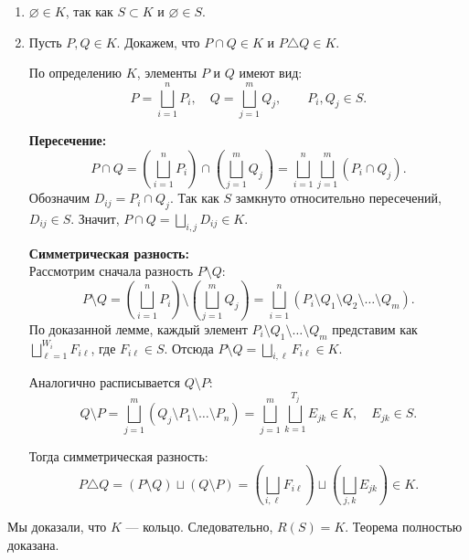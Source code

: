 \begin{Proof}
    \begin{enumerate}[label=\arabic*)]
        \item $\varnothing \in K$, так как $S \subset K$ и $\varnothing \in S$. %
        \item Пусть $P, Q \in K$. Докажем, что $P \cap Q \in K$ и $P \triangle Q \in K$. %
        
        По определению $K$, элементы $P$ и $Q$ имеют вид:
        \[
            P = \bigsqcup_{i=1}^{n} P_i, \quad Q = \bigsqcup_{j=1}^{m} Q_j, \qquad P_i, Q_j \in S.
        \]
        
        \textbf{Пересечение:}
        \[
            P \cap Q = \left( \bigsqcup_{i=1}^{n} P_i \right) \cap \left( \bigsqcup_{j=1}^{m} Q_j \right) = \bigsqcup_{i=1}^{n} \bigsqcup_{j=1}^{m} (P_i \cap Q_j).
        \]
        Обозначим $D_{ij} = P_i \cap Q_j$. Так как $S$ замкнуто относительно пересечений, $D_{ij} \in S$. Значит, $P \cap Q = \bigsqcup_{i,j} D_{ij} \in K$. %

        \textbf{Симметрическая разность:} \\
        Рассмотрим сначала разность $P \setminus Q$: %
        \[
            P \setminus Q = \left( \bigsqcup_{i=1}^{n} P_i \right) \setminus \left( \bigsqcup_{j=1}^{m} Q_j \right) = \bigsqcup_{i=1}^{n} (P_i \setminus Q_1 \setminus Q_2 \setminus \dots \setminus Q_m).
        \]
        По доказанной лемме, каждый элемент $P_i \setminus Q_1 \setminus \dots \setminus Q_m$ представим как $\bigsqcup_{\ell=1}^{W_i} F_{i\ell}$, где $F_{i\ell} \in S$. %
        Отсюда $P \setminus Q = \bigsqcup_{i, \ell} F_{i\ell} \in K$.
        
        Аналогично расписывается $Q \setminus P$:
        \[
            Q \setminus P = \bigsqcup_{j=1}^{m} (Q_j \setminus P_1 \setminus \dots \setminus P_n) = \bigsqcup_{j=1}^{m} \bigsqcup_{k=1}^{T_j} E_{jk} \in K, \quad E_{jk} \in S. %
        \]
        
        Тогда симметрическая разность:
        \[
            P \triangle Q = (P \setminus Q) \sqcup (Q \setminus P) = \left( \bigsqcup_{i, \ell} F_{i\ell} \right) \sqcup \left( \bigsqcup_{j, k} E_{jk} \right) \in K. %
        \]
    \end{enumerate}
    Мы доказали, что $K$ --- кольцо. Следовательно, $R(S) = K$. Теорема полностью доказана. %
\end{Proof}

